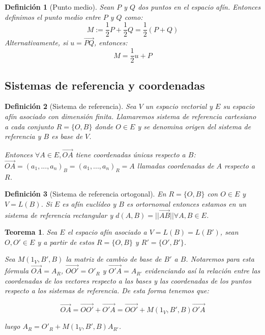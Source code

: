 \documentclass[11pt, a4paper]{article}
\newif\IfInSansMode
\renewcommand{\vec}{\overrightarrow}
\theoremstyle{theorem-style}
\newtheorem{nth}{Teorema}[section]
\theoremstyle{definition-style}
\newtheorem{ndef}{Definición}[section]
\theoremstyle{remark-style}
\theoremstyle{example-style}
\begin{document}
\begin{ndef}[Punto medio]
  Sean $P$ y $Q$ dos puntos en el espacio afín. Entonces definimos el punto medio entre $P$ y $Q$ como:
  \[
    M := \dfrac{1}{2} P + \dfrac{1}{2}Q = \dfrac{1}{2}(P+Q)
  \]
  Alternativamente, si $u = \overrightarrow{PQ}$, entonces:
  \[
    M = \dfrac{1}{2}u + P
  \]

\end{ndef}

\subsection{Sistemas de referencia y coordenadas}

\begin{ndef}[Sistema de referencia]
Sea $V$ un espacio vectorial y $E$ su espacio afín asociado con dimensión finita. Llamaremos \textit{ sistema de referencia cartesiano } a cada conjunto $R=\{O,B\}$ donde $O\in E$ y se denomina \textit{origen del sistema de referencia} y $B$ es base de $V$.

Entonces $\forall A \in E, \vec{OA}$ tiene coordenadas únicas respecto a $B$: $\vec{OA}=(a_1,...,a_n)_B=(a_1,...,a_n)_R=A$ llamadas coordenadas de $A$ respecto a $R$. 

\end{ndef}

\begin{ndef}[Sistema de referencia ortogonal]
En $R=\{O,B\}$ con $O\in E$ y $V=L(B)$. Si $E$ es afín euclídeo y $B$ es ortornomal entonces estamos en un \textit{sistema de referencia rectangular} y $d(A,B)=||\vec{AB}|| \forall A,B \in E$.

\end{ndef}

\begin{nth}

Sea $E$ el espacio afín asociado a $V=L(B)=L(B')$, sean $O,O'\in E$ y a partir de estos $R=\{O,B\}$ y $R'=\{O',B'\}$.

Sea $M(1_V,B',B)$ la matriz de cambio de base de $B'$ a $B$. Notaremos para esta fórmula $\vec{OA}=A_R$, $\vec{OO'}=O'_R$ y $\vec{O'A}=A_{R'}$ evidenciando así la relación entre las coordenadas de los vectores respecto a las bases y las coordenadas de los puntos respecto a los sistemas de referencia. De esta forma tenemos que:

$$\vec{OA}=\vec{OO'}+\vec{O'A}=\vec{OO'}+M(1_V,B',B)\vec{O'A}$$

luego $A_R=O'_R+M(1_V,B',B)A_{R'}$.

\end{nth}
\end{document}
